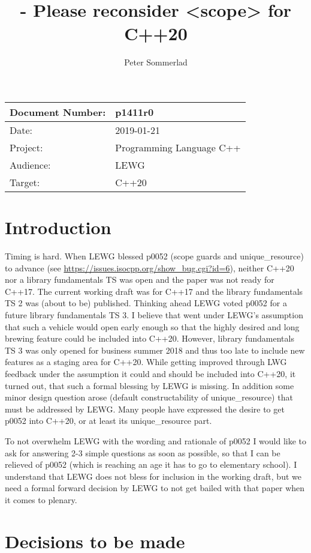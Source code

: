 \documentclass[ebook,11pt,article]{memoir}
\title{\papernumber{} - Please reconsider <scope> for C++20}
\author{Peter Sommerlad}
\date{\paperdate}                %
\newcommand{\papernumber}{p1411r0}
\newcommand{\paperdate}{2019-01-21}
\begin{document}
\maketitle
\begin{center}
\begin{tabular}[t]{|l|l|}\hline 
Document Number:&  \papernumber \hfill \\\hline
Date: & \paperdate \\\hline
Project: & Programming Language C++\\\hline 
Audience: & LEWG\\\hline
Target: & C++20 \\\hline
\end{tabular}
\end{center}
\chapter{Introduction}
Timing is hard. When LEWG blessed p0052 (scope guards and unique_resource) to advance (see \url{https://issues.isocpp.org/show_bug.cgi?id=6}), neither C++20 nor a library fundamentals TS was open and the paper was not ready for C++17. The current working draft was for C++17 and the library fundamentals TS 2 was (about to be) published. Thinking ahead LEWG voted p0052 for a future library fundamentals TS 3. I believe that went under LEWG's assumption that such a vehicle would open early enough so that the highly desired and long brewing feature could be included into C++20. However, library fundamentals TS 3 was only opened for business summer 2018 and thus too late to include new features as a staging area for C++20. While getting improved through LWG feedback under the assumption it could and should be included into C++20, it turned out, that such a formal blessing by LEWG is missing. In addition some minor design question arose (default constructability of unique_resource) that must be addressed by LEWG. Many people have expressed the desire to get p0052 into C++20, or at least its unique_resource part.

To not overwhelm LEWG with the wording and rationale of p0052 I would like to ask for answering 2-3 simple questions as soon as possible, so that I can be relieved of p0052 (which is reaching an age it has to go to elementary school). I understand that LEWG does not bless for inclusion in the working draft, but we need a formal forward decision by LEWG to not get bailed with that paper when it comes to plenary.
\chapter{Decisions to be made}
\end{document}
